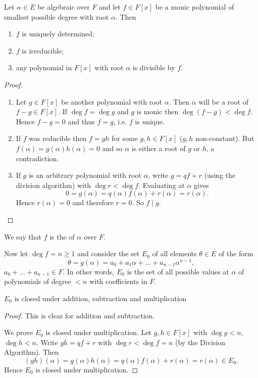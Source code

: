 \begin{proposition}
	Let $\alpha \in E$ be algebraic over $F$ and let $f \in F[x]$ be a monic polynomial of smallest possible degree with root $\alpha$. Then
	\begin{enumerate}
		\item $f$ is uniquely determined;
		\item $f$ is irreducible;
		\item any polynomial in $F[x]$ with root $\alpha$ is divisible by $f$.
	\end{enumerate}
	\begin{proof}\hfill
		\begin{enumerate}
			\item Let $g \in F[x]$ be another polynomial with root $\alpha$. Then $\alpha$ will be a root of $f - g \in F[x]$. If $\deg{f} = \deg{g}$ and $g$ is monic then $\deg(f - g) < \deg{f}$. Hence $f - g = 0$ and thus $f = g$, i.e. $f$ is unique.
			\item If $f$ was reducible then $f = gh$ for some $g, h \in F[x]$ ($g, h$ non-constant). But $f(\alpha) = g(\alpha)h(\alpha) = 0$ and so $\alpha$ is either a root of $g$ or $h$, a contradiction.
			\item If $g$ is an arbitrary polynomial with root $\alpha$, write $g = qf + r$ (using the division algorithm) with $\deg{r} < \deg{f}$. Evaluating at $\alpha$ gives
			\[
				0 = g(\alpha) = q(\alpha)f(\alpha) + r(\alpha) = r(\alpha).
			\]
			Hence $r(\alpha) = 0$ and therefore $r = 0$. So $f \mid g$.
		\end{enumerate}
	\end{proof}
\end{proposition}

We say that $f$ is the  of $\alpha$ over $F$.

Now let $\deg{f} = n \geq 1$ and consider the set $E_0$ of all elements $\theta
\in E$ of the form
\[
	\theta = g(\alpha) = a_0 + a_1 \alpha + \dots + a_{n - 1} \alpha^{n - 1},
\]
$a_0 + \dots + a_{n - 1} \in F$. In other words, $E_0$ is the set of all 
possible values at $\alpha$ of polynomials of degree $< n$ with coefficients in
 $F$.

\begin{proposition}
	$E_0$ is closed under addition, subtraction and multiplication
	\begin{proof}
		This is clear for addition and subtraction.
		
		We prove $E_0$ is closed under multiplication. Let $g, h \in F[x]$ with $\deg{g} < n$, $\deg{h} < n$. Write $gh = qf + r$ with $\deg{r} < \deg{f} = n$ (by the Division Algorithm). Then
		\[
			(gh)(\alpha) = g(\alpha)h(\alpha) = q(\alpha)f(\alpha) + r(\alpha) = r(\alpha) \in E_0.
		\]
		Hence $E_0$ is closed under multiplication.
	\end{proof}
\end{proposition}


